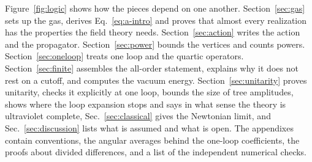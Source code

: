 \documentclass[a4paper,11pt]{article}
\begin{document}
Figure~\ref{fig:logic} shows how the pieces depend on one another. Section~\ref{sec:gas} sets up the gas, derives Eq.~\eqref{eq:a-intro} and proves that almost every realization has the properties the field theory needs. Section~\ref{sec:action} writes the action and the propagator. Section~\ref{sec:power} bounds the vertices and counts powers. Section~\ref{sec:oneloop} treats one loop and the quartic operators. Section~\ref{sec:finite} assembles the all-order statement, explains why it does not rest on a cutoff, and computes the vacuum energy. Section~\ref{sec:unitarity} proves unitarity, checks it explicitly at one loop, bounds the size of tree amplitudes, shows where the loop expansion stops and says in what sense the theory is ultraviolet complete, Sec.~\ref{sec:classical} gives the Newtonian limit, and Sec.~\ref{sec:discussion} lists what is assumed and what is open. The appendixes contain conventions, the angular averages behind the one-loop coefficients, the proofs about divided differences, and a list of the independent numerical checks.
\end{document}
